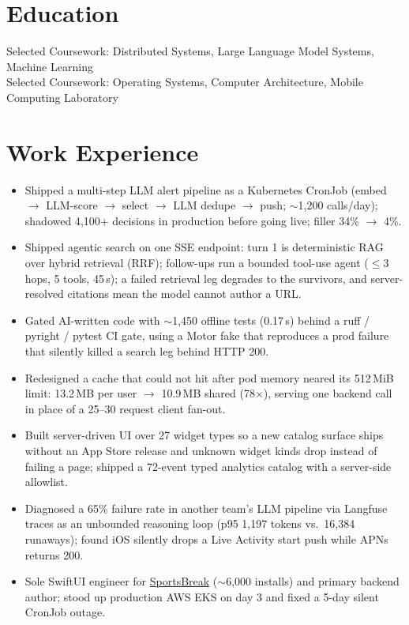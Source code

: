 \documentclass[11pt, letterpaper]{article}
\begin{document}

\section{Education}
Selected Coursework: Distributed Systems, Large Language Model Systems, Machine Learning\\[1pt]
Selected Coursework: Operating Systems, Computer Architecture, Mobile Computing Laboratory

\section{Work Experience}
\begin{itemize}
  \item Shipped a multi-step LLM alert pipeline as a Kubernetes CronJob (embed $\to$ LLM-score $\to$ select $\to$ LLM dedupe $\to$ push; $\sim$1{,}200 calls/day); shadowed 4{,}100+ decisions in production before going live; filler 34\% $\to$ 4\%.
  \item Shipped agentic search on one SSE endpoint: turn 1 is deterministic RAG over hybrid retrieval (RRF); follow-ups run a bounded tool-use agent ($\le$3 hops, 5 tools, 45\,s); a failed retrieval leg degrades to the survivors, and server-resolved citations mean the model cannot author a URL.
  \item Gated AI-written code with $\sim$1{,}450 offline tests (0.17\,s) behind a ruff / pyright / pytest CI gate, using a Motor fake that reproduces a prod failure that silently killed a search leg behind HTTP 200.
  \item Redesigned a cache that could not hit after pod memory neared its 512\,MiB limit: 13.2\,MB per user $\to$ 10.9\,MB shared (78$\times$), serving one backend call in place of a 25--30 request client fan-out.
  \item Built server-driven UI over 27 widget types so a new catalog surface ships without an App Store release and unknown widget kinds drop instead of failing a page; shipped a 72-event typed analytics catalog with a server-side allowlist.
  \item Diagnosed a 65\% failure rate in another team's LLM pipeline via Langfuse traces as an unbounded reasoning loop (p95 1{,}197 tokens vs.\ 16{,}384 runaways); found iOS silently drops a Live Activity start push while APNs returns 200.
  \item Sole SwiftUI engineer for \href{https://apps.apple.com/app/id6762649287}{SportsBreak} ($\sim$6{,}000 installs) and primary backend author; stood up production AWS EKS on day 3 and fixed a 5-day silent CronJob outage.
\end{itemize}
\end{document}

